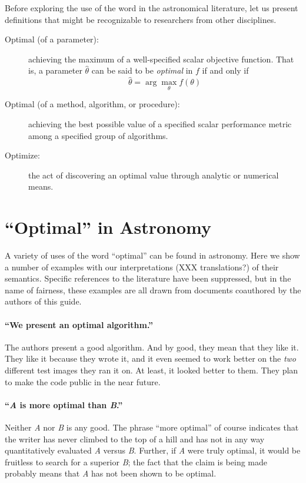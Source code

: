 \documentclass[12pt, preprint]{aastex}
\begin{document}
Before exploring the use of the word in the astronomical literature, let
us present definitions that might be recognizable to researchers from other
disciplines.

\begin{description}
\item[Optimal (of a parameter):] achieving the maximum of a
  well-specified scalar objective function.  That is, a parameter
  $\hat{\theta}$ can be said to be \emph{optimal} in $f$ if and only
  if
  \[
  \hat{\theta} = \arg\max_{\theta} f(\theta)
  \]
\item[Optimal (of a method, algorithm, or procedure):] achieving the
  best possible value of a specified scalar performance metric among a
  specified group of algorithms.
\item[Optimize:] the act of discovering an optimal value through analytic or
  numerical means.
\end{description}

\section{``Optimal'' in Astronomy}

A variety of uses of the word ``optimal'' can be found in astronomy.
Here we show a number of examples with our interpretations (XXX
translations?) of their semantics.
%
Specific references to the literature have been suppressed, but in the
name of fairness, these examples are all drawn from documents
coauthored by the authors of this guide.


\paragraph{``We present an optimal algorithm.''}
The authors present a good algorithm.  And by good, they
mean that they like it.  They like it because they wrote it, and it
even seemed to work better on the \emph{two} different test images
they ran it on.  At least, it looked better to them.  They plan
to make the code public in the near future.



\paragraph{``\emph{A} is more optimal than \emph{B}.''}
Neither \emph{A} nor \emph{B} is any good.  The phrase
``more optimal'' of course indicates that the writer has never climbed
to the top of a hill and has not in any way quantitatively evaluated
\emph{A} versus \emph{B}.  Further, if \emph{A} were truly optimal, it
would be fruitless to search for a superior \emph{B}; the fact that
the claim is being made probably means that \emph{A} has not been
shown to be optimal.
\end{document}
